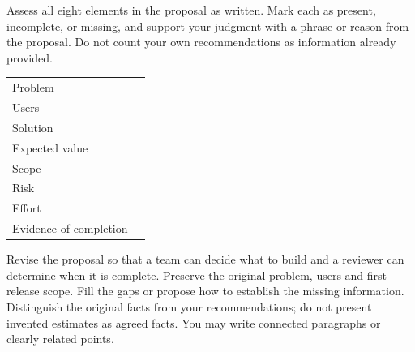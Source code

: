 {Assess all eight elements in the proposal as written. Mark each as present, incomplete, or missing, and support your judgment with a phrase or reason from the proposal. Do not count your own recommendations as information already provided.}
\begingroup\renewcommand{\tabularxcolumn}[1]{m{#1}}
\begin{tabularx}{\linewidth}{|>{\raggedright\arraybackslash}m{4.1cm}|P|}\hline
{} & \\\hline
Problem & \rule{0pt}{.76cm}\\\hline
Users & \rule{0pt}{.76cm}\\\hline
Solution & \rule{0pt}{.76cm}\\\hline
Expected value & \rule{0pt}{.76cm}\\\hline
Scope & \rule{0pt}{.76cm}\\\hline
Risk & \rule{0pt}{.76cm}\\\hline
Effort & \rule{0pt}{.76cm}\\\hline
Evidence of completion & \rule{0pt}{.76cm}\\\hline
\end{tabularx}\endgroup
\newpage
{Revise the proposal so that a team can decide what to build and a reviewer can determine when it is complete. Preserve the original problem, users and first-release scope. Fill the gaps or propose how to establish the missing information. Distinguish the original facts from your recommendations; do not present invented estimates as agreed facts. You may write connected paragraphs or clearly related points.}
\answerlabel\blankbox{3cm}
